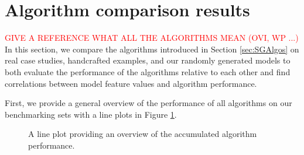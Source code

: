 \section{Algorithm comparison results}
\textcolor{red}{GIVE A REFERENCE WHAT ALL THE ALGORITHMS MEAN (OVI, WP ...)}
In this section, we compare the algorithms introduced in Section \ref{sec:SGAlgos} on real case studies, handcrafted examples, and our randomly generated models to both evaluate the 
performance of the algorithms relative to each other and find correlations between model feature values and algorithm performance.

First, we provide a general overview of the performance of all algorithms on our benchmarking sets with a line plots in Figure \ref{fig:AlgoPerformance}.
\begin{figure}[h!]
    \centering
    \qquad
    \qquad
    \caption[Overview of Algorithm Performance]{
        A line plot providing an overview of the accumulated algorithm performance.
        }%
    \label{fig:AlgoPerformanceBig}
    \label{fig:AlgoPerformance}
\end{figure}

